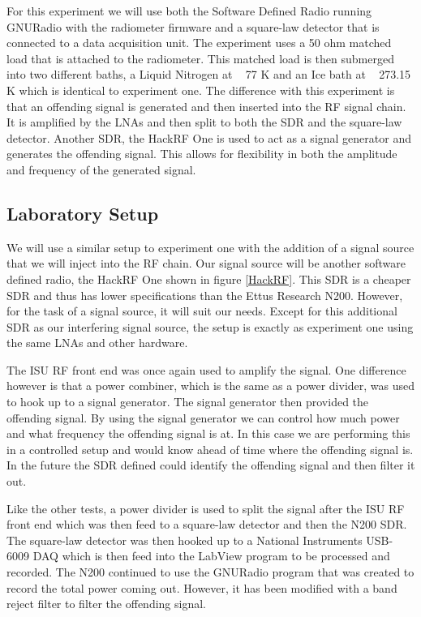 For this experiment we will use both the Software Defined Radio running GNURadio with the radiometer firmware and a square-law detector that is connected to a data acquisition unit.  The experiment uses a 50 ohm matched load that is attached to the radiometer.  This matched load is then submerged into two different baths, a Liquid Nitrogen at ~ 77 K and an Ice bath at ~ 273.15 K which is identical to experiment one.  The difference with this experiment is that an offending signal is generated and then inserted into the RF signal chain.  It is amplified by the LNAs and then split to both the SDR and the square-law detector.  Another SDR, the HackRF One is used to act as a signal generator and generates the offending signal.  This allows for flexibility in both the amplitude and frequency of the generated signal.

\subsection{Laboratory Setup}
We will use a similar setup to experiment one with the addition of a signal source that we will inject into the RF chain.  Our signal source will be another software defined radio, the HackRF One shown in figure \ref{HackRF}.  This SDR is a cheaper SDR and thus has lower specifications than the Ettus Research N200.  However, for the task of a signal source, it will suit our needs.  Except for this additional SDR as our interfering signal source, the setup is exactly as experiment one using the same LNAs and other hardware.

The ISU RF front end was once again used to amplify the signal.  One difference however is that a power combiner, which is the same as a power divider, was used to hook up to a signal generator.  The signal generator then provided the offending signal.  By using the signal generator we can control how much power and what frequency the offending signal is at.  In this case we are performing this in a controlled setup and would know ahead of time where the offending signal is.  In the future the SDR defined could identify the offending signal and then filter it out.

Like the other tests, a power divider is used to split the signal after the ISU RF front end which was then feed to a square-law detector and then the N200 SDR.  The square-law detector was then hooked up to a National Instruments USB-6009 DAQ which is then feed into the LabView program to be processed and recorded.  The N200 continued to use the GNURadio program that was created to record the total power coming out.  However, it has been modified with a band reject filter to filter the offending signal.

